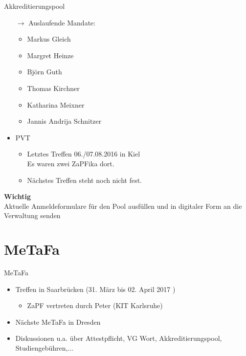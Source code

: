 \documentclass[compress, aspectratio=169]{beamer}
\begin{document}
\begin{frame}{Akkreditierungspool}
  \begin{itemize}
    \item[$\rightarrow$] Auslaufende Mandate:
      \begin{itemize}
      \item Markus Gleich
      \item Margret Heinze
      \item Björn Guth
      \item Thomas Kirchner
      \item Katharina Meixner
      \item Jannis Andrija Schnitzer
      \end{itemize}
    \item PVT
      \begin{itemize}
      \item Letztes Treffen 06./07.08.2016 in Kiel\\
        Es waren zwei ZaPFika dort.
      \item Nächstes Treffen steht noch nicht fest.
      \end{itemize}
    \end{itemize}
\end{frame}

\begin{frame}
  \begin{framed}
    \begin{center}
      {\Huge \textbf{Wichtig}}\\
      \vspace{0.5cm}
      {\Large Aktuelle Anmeldeformulare für den Pool ausfüllen und in digitaler Form an die Verwaltung senden}
      \end{center}
      \end{framed}
\end{frame}

\section{MeTaFa}

\begin{frame}{MeTaFa}
  \begin{itemize}
  \item Treffen in Saarbrücken (31. März bis 02. April 2017 )
    \begin{itemize}
    \item ZaPF vertreten durch Peter (KIT Karlsruhe)
    \end{itemize}
  \item Nächste MeTaFa in Dresden
  \item Diskussionen u.a. über Attestpflicht, VG Wort, Akkreditierungspool, Studiengebühren,...
  \end{itemize}
\end{frame}
\end{document}
